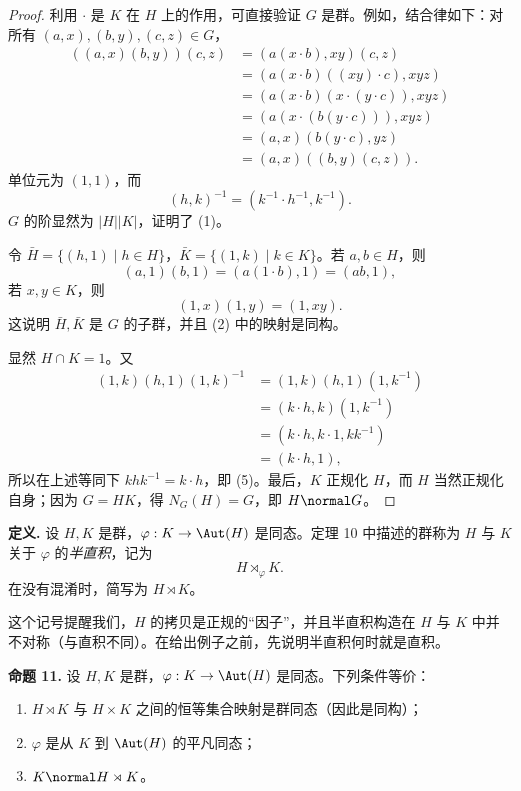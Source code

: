 \begin{proof}
利用 $\cdot$ 是 $K$ 在 $H$ 上的作用，可直接验证 $G$ 是群。例如，结合律如下：对所有 $(a,x),(b,y),(c,z)\in G$，
\begin{align*}
((a,x)(b,y))(c,z)
&=(a(x\cdot b),xy)(c,z)\\
&=(a(x\cdot b)((xy)\cdot c),xyz)\\
&=(a(x\cdot b)(x\cdot(y\cdot c)),xyz)\\
&=(a(x\cdot(b(y\cdot c))),xyz)\\
&=(a,x)(b(y\cdot c),yz)\\
&=(a,x)((b,y)(c,z)).
\end{align*}
单位元为 $(1,1)$，而
\[
  (h,k)^{-1}=(k^{-1}\cdot h^{-1},k^{-1}).
\]
$G$ 的阶显然为 $|H||K|$，证明了 (1)。

令 $\bar H=\{(h,1)\mid h\in H\}$，$\bar K=\{(1,k)\mid k\in K\}$。若 $a,b\in H$，则
\[
  (a,1)(b,1)=(a(1\cdot b),1)=(ab,1),
\]
若 $x,y\in K$，则
\[
  (1,x)(1,y)=(1,xy).
\]
这说明 $\bar H,
\bar K$ 是 $G$ 的子群，并且 (2) 中的映射是同构。

显然 $H\cap K=1$。又
\begin{align*}
(1,k)(h,1)(1,k)^{-1}
&=(1,k)(h,1)(1,k^{-1})\\
&=(k\cdot h,k)(1,k^{-1})\\
&=(k\cdot h,k\cdot1,kk^{-1})\\
&=(k\cdot h,1),
\end{align*}
所以在上述等同下 $khk^{-1}=k\cdot h$，即 (5)。最后，$K$ 正规化 $H$，而 $H$ 当然正规化自身；因为 $G=HK$，得 $N_G(H)=G$，即 $H\normal G$。
\end{proof}

\noindent\textbf{定义.} 设 $H,K$ 是群，$\varphi:K\to\Aut(H)$ 是同态。定理 10 中描述的群称为 $H$ 与 $K$ 关于 $\varphi$ 的\emph{半直积}，记为
\[
  H\rtimes_\varphi K.
\]
在没有混淆时，简写为 $H\rtimes K$。

这个记号提醒我们，$H$ 的拷贝是正规的“因子”，并且半直积构造在 $H$ 与 $K$ 中并不对称（与直积不同）。在给出例子之前，先说明半直积何时就是直积。

\medskip
\noindent\textbf{命题 11.} 设 $H,K$ 是群，$\varphi:K\to\Aut(H)$ 是同态。下列条件等价：
\begin{enumerate}[label=(\arabic*)]
  \item $H\rtimes K$ 与 $H\times K$ 之间的恒等集合映射是群同态（因此是同构）；
  \item $\varphi$ 是从 $K$ 到 $\Aut(H)$ 的平凡同态；
  \item $K\normal H\rtimes K$。
\end{enumerate}

